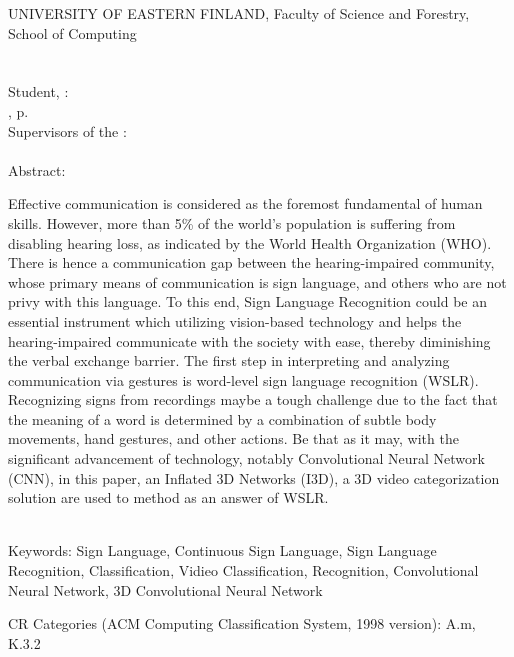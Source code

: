 \begin{spacing}{1.0}
\newpage


UNIVERSITY OF EASTERN FINLAND, Faculty of Science and Forestry, \campus School of Computing\\
\facultyschooleng \\ \\
Student, \authorname : \thesistitle \\
\documenttypeeng , \mypagecount p.\\
Supervisors of the \documenttypeeng : \supervisorseng \\
\ajankohtaenglish \\


Abstract:

Effective communication is considered as the foremost fundamental of human skills. However, more than 5\% of the world's population is suffering from disabling hearing loss, as indicated by the World Health Organization (WHO). There is hence a communication gap between the hearing-impaired community, whose primary means of communication is sign language, and others who are not privy with this language. To this end, Sign Language Recognition could be an essential instrument which utilizing vision-based technology and helps the hearing-impaired communicate with the society with ease, thereby diminishing the verbal exchange barrier. The first step in interpreting and analyzing communication via gestures is word-level sign language recognition (WSLR). Recognizing signs from recordings maybe a tough challenge due to the fact that the meaning of a word is determined by a combination of subtle body movements, hand gestures, and other actions. Be that as it may, with the significant advancement of technology, notably Convolutional Neural Network (CNN), in this paper, an Inflated 3D Networks (I3D), a 3D video categorization solution are used to method as an answer of WSLR.




~\\ %
Keywords:
Sign Language, Continuous Sign Language, Sign Language Recognition, Classification,
Vidieo Classification, Recognition, Convolutional Neural Network, 3D Convolutional Neural Network




CR Categories (ACM Computing Classification System,
1998 version): A.m, K.3.2\\

\end{spacing}


